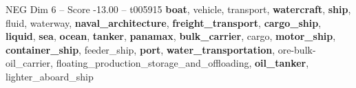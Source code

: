 \begin{textsample}{NEG Dim 6 – Score -13.00 – t005915}  \label{ex:f6_neg_001}
\textbf{boat}, vehicle, transport, \textbf{watercraft}, \textbf{ship}, fluid, waterway, \textbf{naval\_architecture}, \textbf{freight\_transport}, \textbf{cargo\_ship}, \textbf{liquid}, \textbf{sea}, \textbf{ocean}, \textbf{tanker}, \textbf{panamax}, \textbf{bulk\_carrier}, cargo, \textbf{motor\_ship}, \textbf{container\_ship}, feeder\_ship, \textbf{port}, \textbf{water\_transportation}, ore-bulk-oil\_carrier, floating\_production\_storage\_and\_offloading, \textbf{oil\_tanker}, lighter\_aboard\_ship

\end{textsample}
